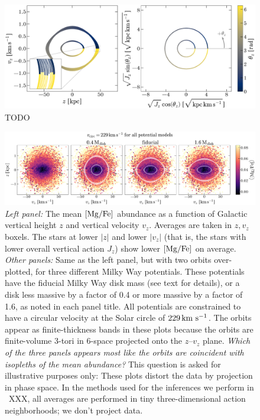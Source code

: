 \documentclass[modern]{aastex63}
\begin{document}
\begin{figure}[!t]
  \begin{center}
  \includegraphics[width=\textwidth]{zvz-orbit-demo.pdf}
  \end{center}
  \caption{%
    TODO
  \label{fig:zvz-demo}
  }
\end{figure}

\begin{figure}[!t]
  \begin{center}
  \includegraphics[width=\textwidth]{zvz-mean-MG_FE}
  \end{center}
  \caption{%
    \textsl{Left panel:} The mean ${[\mathrm{Mg}/\mathrm{Fe}]}$ abundance as a function of
    Galactic vertical height $z$ and vertical velocity $v_z$.
    Averages are taken in $z, v_z$ boxels.
    The stars at lower $|z|$ and lower $|v_z|$ (that is, the stars with
    lower overall vertical action $J_z$) show lower ${[\mathrm{Mg}/\mathrm{Fe}]}$ on average.
    \textsl{Other panels:} Same as the left panel, but with two orbits
    over-plotted, for three different Milky Way potentials.
    These potentials have the fiducial Milky Way disk mass (see text
    for details), or a disk less massive by a factor of 0.4 or more
    massive by a factor of 1.6, as noted in each panel title.
    All potentials are constrained to have a circular velocity at the
    Solar circle of $229\,\mathrm{km}~\mathrm{s}^{-1}$.
    The orbits appear as finite-thickness bands in these plots because
    the orbits are finite-volume 3-tori in 6-space projected onto the
    $z$--$v_z$ plane.
    \emph{Which of the three panels appears most like the orbits are
    coincident with isopleths of the mean abundance?}
    This question is asked for illustrative purposes only: These
    plots distort the data by projection in phase space.
    In the methods used for the inferences we perform in
    \sectionname~XXX, all averages are performed in tiny
    three-dimensional action neighborhoods; we don't project data.
  \label{fig:zvz-mgfe}
  }
\end{figure}
\end{document}
